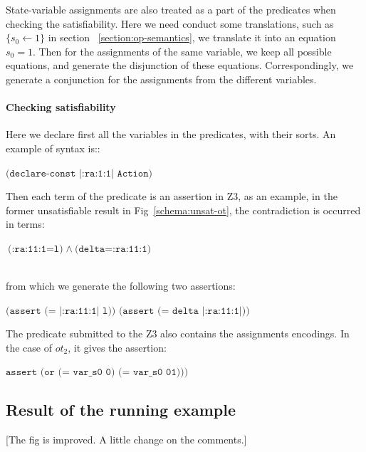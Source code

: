 \documentclass{lncs/llncs}
\newcommand{\TODO}[1]{\textcolor{red}{\textbf{[TODO:#1]}}}
\newcommand{\OTvar}{\texttt}
\newcommand{\OTland}{\;\land\ }
\newcommand{\QIN}[1]{\textcolor{airforceblue}{#1}}
\begin{document}
State-variable assignments are also treated as a part of the
predicates when checking the satisfiability. Here we need conduct some
translations, such as $\{s_0 \leftarrow 1\}$ in section
~\ref{section:op-semantics}, we translate it into an equation
$s_0=1$. Then for the assignments of the same variable, we keep all
possible equations, and generate the disjunction of
these equations. Correspondingly, we generate a conjunction for the
assignments from the different variables. 


\paragraph{Checking satisfiability}

Here we declare first all the variables in the predicates, with their
sorts.
An example of syntax is::\\
\centerline{$\OTvar{(declare-const\ |:ra:1:1|\ Action)}$}

\noindent Then each term of the
predicate is an assertion in Z3, as an example, in the former
unsatisfiable result in Fig~\ref{schema:unsat-ot}, the contradiction is occurred in terms: \\
\centerline{$\OTvar{(:ra:11:1=l)} \OTland \OTvar{(delta=:ra:11:1)}$}\\
from which we generate the following two assertions:\\
\centerline{$\OTvar{(assert\ (=\ |:ra:11:1|\ l))\ \ \ (assert\ (=\ delta\ |:ra:11:1|))}$}

\noindent The predicate submitted to the Z3 also contains the
assignments encodings.
In the case of $ot_2$, it
gives the assertion:\\
\centerline{$\OTvar{assert (or (= var\_s0 0) (= var\_s0 01)))}$}


\subsection{Result of the running example}
\label{section:full-result}

\QIN{[The fig is improved. A little change on the comments.]}
\end{document}
